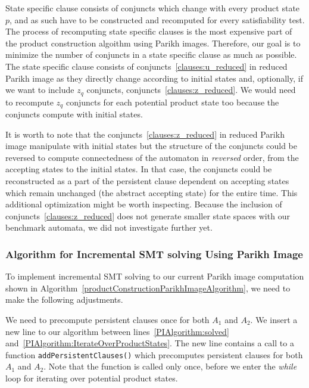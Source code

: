 State specific clause consists of conjuncts which change with every product state $p$, and as such have to be constructed and recomputed for every satisfiability test. The process of recomputing state specific clauses is the most expensive part of the product construction algoithm using Parikh images. Therefore, our goal is to minimize the number of conjuncts in a state specific clause as much as possible. The state specific clause consists of conjuncts~\ref{clauses:u_reduced} in reduced Parikh image as they directly change according to initial states and, optionally, if we want to include $z_{q}$ conjuncts, conjuncts~\ref{clauses:z_reduced}. We would need to recompute $z_{q}$ conjuncts for each potential product state too because the conjuncts compute with initial states.

It is worth to note that the conjuncts~\ref{clauses:z_reduced} in reduced Parikh image manipulate with initial states but the structure of the conjuncts could be reversed to compute connectedness of the automaton in \emph{reversed} order, from the accepting states to the initial states. In that case, the conjuncts could be reconstructed as a part of the persistent clause dependent on accepting states which remain unchanged (the abstract accepting state) for the entire time. This additional optimization might be worth inspecting. Because the inclusion of conjuncts~\ref{clauses:z_reduced} does not generate smaller state spaces with our benchmark automata, we did not investigate further yet.

\subsubsection{Algorithm for Incremental SMT solving Using Parikh Image}


To implement incremental SMT solving to our current Parikh image computation shown in Algorithm~\ref{productConstructionParikhImageAlgorithm}, we need to make the following adjustments.

We need to precompute persistent clauses once for both $A_1$ and $A_2$. We insert a new line to our algorithm between lines~\ref{PIAlgorithm:solved} and~\ref{PIAlgorithm:IterateOverProductStates}. The new line contains a call to a function \texttt{addPersistentClauses()} which precomputes persistent clauses for both $A_1$ and $A_2$. Note that the function is called only once, before we enter the \emph{while} loop for iterating over potential product states.

